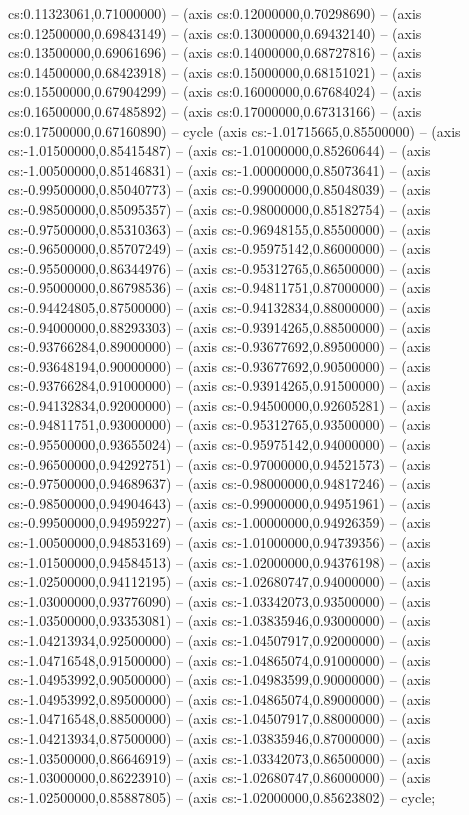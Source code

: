 cs:0.11323061,0.71000000) -- (axis cs:0.12000000,0.70298690) -- (axis cs:0.12500000,0.69843149) -- (axis cs:0.13000000,0.69432140) -- (axis cs:0.13500000,0.69061696) -- (axis cs:0.14000000,0.68727816) -- (axis cs:0.14500000,0.68423918) -- (axis cs:0.15000000,0.68151021) -- (axis cs:0.15500000,0.67904299) -- (axis cs:0.16000000,0.67684024) -- (axis cs:0.16500000,0.67485892) -- (axis cs:0.17000000,0.67313166) -- (axis cs:0.17500000,0.67160890) -- cycle (axis cs:-1.01715665,0.85500000) -- (axis cs:-1.01500000,0.85415487) -- (axis cs:-1.01000000,0.85260644) -- (axis cs:-1.00500000,0.85146831) -- (axis cs:-1.00000000,0.85073641) -- (axis cs:-0.99500000,0.85040773) -- (axis cs:-0.99000000,0.85048039) -- (axis cs:-0.98500000,0.85095357) -- (axis cs:-0.98000000,0.85182754) -- (axis cs:-0.97500000,0.85310363) -- (axis cs:-0.96948155,0.85500000) -- (axis cs:-0.96500000,0.85707249) -- (axis cs:-0.95975142,0.86000000) -- (axis cs:-0.95500000,0.86344976) -- (axis cs:-0.95312765,0.86500000) -- (axis cs:-0.95000000,0.86798536) -- (axis cs:-0.94811751,0.87000000) -- (axis cs:-0.94424805,0.87500000) -- (axis cs:-0.94132834,0.88000000) -- (axis cs:-0.94000000,0.88293303) -- (axis cs:-0.93914265,0.88500000) -- (axis cs:-0.93766284,0.89000000) -- (axis cs:-0.93677692,0.89500000) -- (axis cs:-0.93648194,0.90000000) -- (axis cs:-0.93677692,0.90500000) -- (axis cs:-0.93766284,0.91000000) -- (axis cs:-0.93914265,0.91500000) -- (axis cs:-0.94132834,0.92000000) -- (axis cs:-0.94500000,0.92605281) -- (axis cs:-0.94811751,0.93000000) -- (axis cs:-0.95312765,0.93500000) -- (axis cs:-0.95500000,0.93655024) -- (axis cs:-0.95975142,0.94000000) -- (axis cs:-0.96500000,0.94292751) -- (axis cs:-0.97000000,0.94521573) -- (axis cs:-0.97500000,0.94689637) -- (axis cs:-0.98000000,0.94817246) -- (axis cs:-0.98500000,0.94904643) -- (axis cs:-0.99000000,0.94951961) -- (axis cs:-0.99500000,0.94959227) -- (axis cs:-1.00000000,0.94926359) -- (axis cs:-1.00500000,0.94853169) -- (axis cs:-1.01000000,0.94739356) -- (axis cs:-1.01500000,0.94584513) -- (axis cs:-1.02000000,0.94376198) -- (axis cs:-1.02500000,0.94112195) -- (axis cs:-1.02680747,0.94000000) -- (axis cs:-1.03000000,0.93776090) -- (axis cs:-1.03342073,0.93500000) -- (axis cs:-1.03500000,0.93353081) -- (axis cs:-1.03835946,0.93000000) -- (axis cs:-1.04213934,0.92500000) -- (axis cs:-1.04507917,0.92000000) -- (axis cs:-1.04716548,0.91500000) -- (axis cs:-1.04865074,0.91000000) -- (axis cs:-1.04953992,0.90500000) -- (axis cs:-1.04983599,0.90000000) -- (axis cs:-1.04953992,0.89500000) -- (axis cs:-1.04865074,0.89000000) -- (axis cs:-1.04716548,0.88500000) -- (axis cs:-1.04507917,0.88000000) -- (axis cs:-1.04213934,0.87500000) -- (axis cs:-1.03835946,0.87000000) -- (axis cs:-1.03500000,0.86646919) -- (axis cs:-1.03342073,0.86500000) -- (axis cs:-1.03000000,0.86223910) -- (axis cs:-1.02680747,0.86000000) -- (axis cs:-1.02500000,0.85887805) -- (axis cs:-1.02000000,0.85623802) -- cycle;
